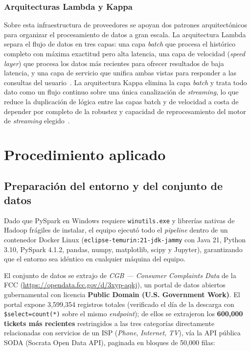 \documentclass[11pt,a4paper]{article}
\begin{document}
    \subsubsection{Arquitecturas Lambda y Kappa}

    Sobre esta infraestructura de proveedores se apoyan dos patrones
    arquitectónicos para organizar el procesamiento de datos a gran
    escala. La arquitectura Lambda separa el flujo de datos en tres capas:
    una capa \emph{batch} que procesa el histórico completo con máxima
    exactitud pero alta latencia, una capa de velocidad
    (\emph{speed layer}) que procesa los datos más recientes para ofrecer
    resultados de baja latencia, y una capa de servicio que unifica ambas
    vistas para responder a las consultas del
    usuario~\autocite{abughazala2024,ganachari2020}. La arquitectura Kappa
    elimina la capa \emph{batch} y trata todo dato como un flujo continuo
    sobre una única canalización de \emph{streaming}, lo que reduce la
    duplicación de lógica entre las capas batch y de velocidad a costa de
    depender por completo de la robustez y capacidad de reprocesamiento
    del motor de \emph{streaming} elegido~\autocite{abughazala2024,ganachari2020}.
\section{Procedimiento aplicado}
\label{sec:procedimiento}

\subsection{Preparación del entorno y del conjunto de datos}
\label{sec:procedimiento-entorno}

Dado que PySpark en Windows requiere \texttt{winutils.exe} y librerías nativas de Hadoop
frágiles de instalar, el equipo ejecutó todo el \emph{pipeline} dentro de un contenedor Docker
Linux (\texttt{eclipse-temurin:21-jdk-jammy} con Java 21, Python 3.10, PySpark 4.1.2, pandas,
numpy, matplotlib, scipy y Jupyter), garantizando que el entorno sea idéntico en cualquier
máquina del equipo.

El conjunto de datos se extrajo de \emph{CGB --- Consumer Complaints Data} de la FCC
(\url{https://opendata.fcc.gov/d/3xyp-aqkj}), un portal de datos abiertos gubernamental con
licencia \textbf{Public Domain (U.S. Government Work)}. El portal expone 3{,}599{,}354 registros
totales (verificado el día de la descarga con \texttt{\$select=count(*)} sobre el mismo
\emph{endpoint}); de ellos se extrajeron los \textbf{600{,}000 tickets más recientes}
restringidos a las tres categorías directamente relacionadas con servicios de un ISP
(\emph{Phone}, \emph{Internet}, \emph{TV}), vía la API pública SODA (Socrata Open Data API),
paginada en bloques de 50{,}000 filas:
\end{document}
